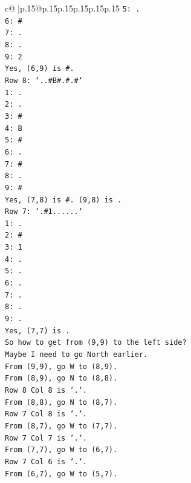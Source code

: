 \documentclass{article}
\begin{document}
{\begin{supertabular}{c@{$\;$}|p{.15\linewidth}@{}p{.15\linewidth}p{.15\linewidth}p{.15\linewidth}p{.15\linewidth}p{.15\linewidth}}
{{{\texttt{5: .} \\
\texttt{6: \#} \\
\texttt{7: .} \\
\texttt{8: .} \\
\texttt{9: 2} \\
\texttt{Yes, (6,9) is \#.} \\
\texttt{Row 8: `..\#B\#.\#.\#`} \\
\texttt{1: .} \\
\texttt{2: .} \\
\texttt{3: \#} \\
\texttt{4: B} \\
\texttt{5: \#} \\
\texttt{6: .} \\
\texttt{7: \#} \\
\texttt{8: .} \\
\texttt{9: \#} \\
\texttt{Yes, (7,8) is \#. (9,8) is .} \\
\texttt{Row 7: `.\#1......`} \\
\texttt{1: .} \\
\texttt{2: \#} \\
\texttt{3: 1} \\
\texttt{4: .} \\
\texttt{5: .} \\
\texttt{6: .} \\
\texttt{7: .} \\
\texttt{8: .} \\
\texttt{9: .} \\
\texttt{Yes, (7,7) is .} \\
\texttt{So how to get from (9,9) to the left side?} \\
\texttt{Maybe I need to go North earlier.} \\
\texttt{From (9,9), go W to (8,9).} \\
\texttt{From (8,9), go N to (8,8).} \\
\texttt{Row 8 Col 8 is `.`.} \\
\texttt{From (8,8), go N to (8,7).} \\
\texttt{Row 7 Col 8 is `.`.} \\
\texttt{From (8,7), go W to (7,7).} \\
\texttt{Row 7 Col 7 is `.`.} \\
\texttt{From (7,7), go W to (6,7).} \\
\texttt{Row 7 Col 6 is `.`.} \\
\texttt{From (6,7), go W to (5,7).} \\
}}}
\end{supertabular}}
\end{document}
